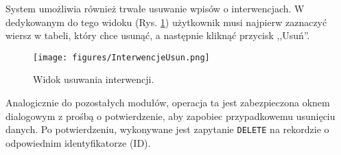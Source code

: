 System umożliwia również trwałe usuwanie wpisów o interwencjach. W dedykowanym do tego widoku (Rys. \ref{fig:interwencje_usuniecie_widok}) użytkownik musi najpierw zaznaczyć wiersz w tabeli, który chce usunąć, a następnie kliknąć przycisk ,,Usuń''.

\begin{figure}[H]
    \centering
    \texttt{[image: figures/InterwencjeUsun.png]}
    \caption{Widok usuwania interwencji.}
    \label{fig:interwencje_usuniecie_widok}
\end{figure}

Analogicznie do pozostałych modułów, operacja ta jest zabezpieczona oknem dialogowym z prośbą o potwierdzenie, aby zapobiec przypadkowemu usunięciu danych. Po potwierdzeniu, wykonywane jest zapytanie \texttt{DELETE} na rekordzie o odpowiednim identyfikatorze (ID).